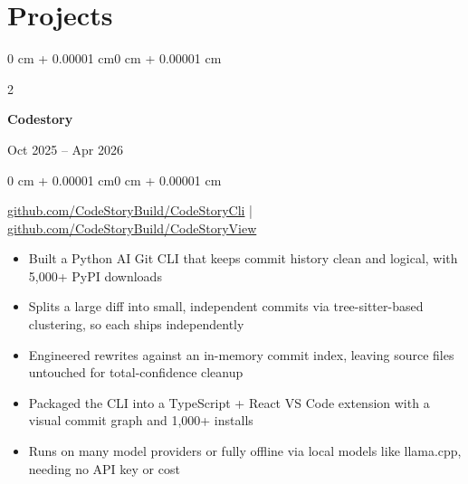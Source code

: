 \documentclass[11pt, letterpaper]{article}
\newenvironment{highlights}{
    \begin{itemize}[
        topsep=0.06 cm,
        parsep=0.06 cm,
        partopsep=0pt,
        itemsep=0pt,
        leftmargin=0 cm + 10pt
    ]
}{\end{itemize}}
\newenvironment{onecolentry}{
    \begin{adjustwidth}{0 cm + 0.00001 cm}{0 cm + 0.00001 cm}
}{\end{adjustwidth}}
\newenvironment{bodyonecolentry}{
    \begin{onecolentry}\small
}{\end{onecolentry}}
\newenvironment{twocolentry}[2][]{
    \onecolentry
    \def\secondColumn{#2}
    \setcolumnwidth{\fill, 4.5 cm}
    \begin{paracol}{2}
}{
    \switchcolumn \raggedleft \secondColumn
    \end{paracol}
    \endonecolentry
}
\let\hrefWithoutArrow\href
\begin{document}
    \section{Projects}

    \begin{twocolentry}{Oct 2025 -- Apr 2026}
        \textbf{Codestory}
    \end{twocolentry}
    \vspace{0.08 cm}
    \begin{bodyonecolentry}
        \hrefWithoutArrow{https://github.com/CodeStoryBuild/CodeStoryCli}{github.com/CodeStoryBuild/CodeStoryCli} \;|\; \hrefWithoutArrow{https://github.com/CodeStoryBuild/CodeStoryView}{github.com/CodeStoryBuild/CodeStoryView}
        \begin{highlights}
            \item Built a Python AI Git CLI that keeps commit history clean and logical, with 5,000+ PyPI downloads
            \item Splits a large diff into small, independent commits via tree-sitter-based clustering, so each ships independently
            \item Engineered rewrites against an in-memory commit index, leaving source files untouched for total-confidence cleanup
            \item Packaged the CLI into a TypeScript + React VS Code extension with a visual commit graph and 1,000+ installs
            \item Runs on many model providers or fully offline via local models like llama.cpp, needing no API key or cost
        \end{highlights}
    \end{bodyonecolentry}

    \vspace{0.12 cm}
\end{document}
